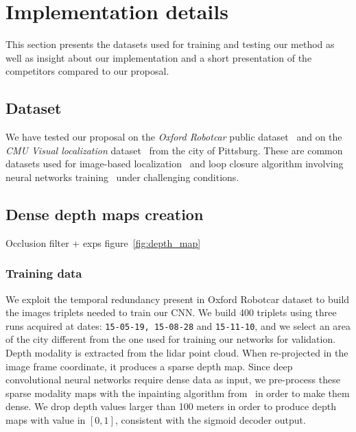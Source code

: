 \section{Implementation details}
\label{sec:impl_details}



This section presents the datasets used for training and testing our method as well as insight about our implementation and a short presentation of the competitors compared to our proposal.

\subsection{Dataset}
\label{subsec:dataset}
	We have tested our proposal on the \textit{Oxford Robotcar} public dataset~\cite{Maddern2016} and on the \textit{CMU Visual localization} dataset~\cite{Bansal2014a} from the city of Pittsburg. These are common datasets used for image-based localization~\cite{Sattler2018} and loop closure algorithm involving neural networks training~\cite{Porav2018} under challenging conditions.
		
\subsection{Dense depth maps creation}

Occlusion filter + exps figure~\ref{fig:depth_map}

\subsubsection{Training data}
	We exploit the temporal redundancy present in Oxford Robotcar dataset to build the images triplets needed to train our CNN. We build 400 triplets using three runs acquired at dates: \texttt{15-05-19, 15-08-28} and \texttt{15-11-10}, and we select an area of the city different from the one used for training our networks for validation.
	Depth modality is extracted from the lidar point cloud. When re-projected in the image frame coordinate, it produces a sparse depth map. Since deep convolutional neural networks require dense data as input, we pre-process these sparse modality maps with the inpainting algorithm from~\cite{Bevilacqua2017} in order to make them dense. We drop depth values larger than 100 meters in order to produce depth maps with value in $[0, 1]$, consistent with the sigmoid decoder output.



